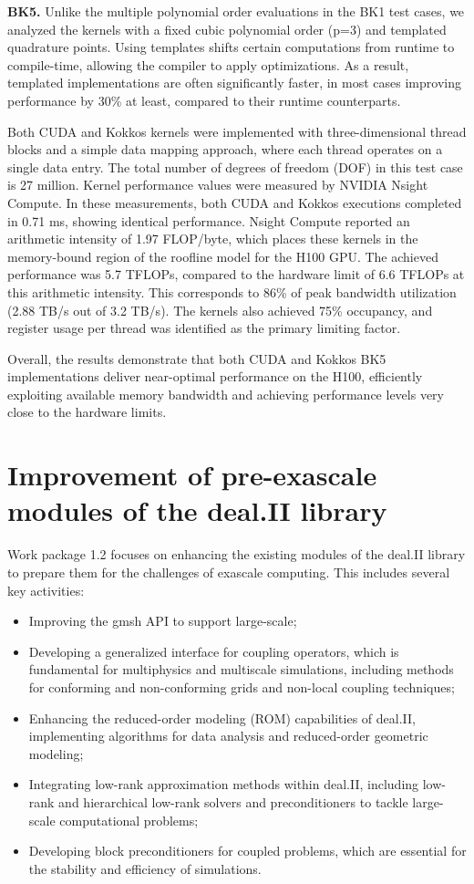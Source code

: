 \documentclass[a4paper,12pt]{article}
\begin{document}
{\bf BK5.} Unlike the multiple polynomial order evaluations in the BK1 test cases, we analyzed the kernels with a fixed cubic polynomial order (p=3) and templated quadrature points. Using templates shifts certain computations from runtime to compile-time, allowing the compiler to apply optimizations. As a result, templated implementations are often significantly faster, in most cases improving performance by 30\% at least, compared to their runtime counterparts.

Both CUDA and Kokkos kernels were implemented with three-dimensional thread blocks and a simple data mapping approach, where each thread operates on a single data entry. The total number of degrees of freedom (DOF) in this test case is 27 million. Kernel performance values were measured by NVIDIA Nsight Compute. In these measurements, both CUDA and Kokkos executions completed in 0.71 ms, showing identical performance. Nsight Compute reported an arithmetic intensity of 1.97 FLOP/byte, which places these kernels in the memory-bound region of the roofline model for the H100 GPU. The achieved performance was 5.7 TFLOPs, compared to the hardware limit of 6.6 TFLOPs at this arithmetic intensity. This corresponds to 86\% of peak bandwidth utilization (2.88 TB/s out of 3.2 TB/s). The kernels also achieved 75\% occupancy, and register usage per thread was identified as the primary limiting factor.

Overall, the results demonstrate that both CUDA and Kokkos BK5 implementations deliver near-optimal performance on the H100, efficiently exploiting available memory bandwidth and achieving performance levels very close to the hardware limits.


\section{Improvement of pre-exascale modules of the deal.II library}

Work package 1.2 focuses on enhancing the existing modules of the deal.II
library to prepare them for the challenges of exascale computing. This includes
several key activities: 
\begin{itemize}
    \item Improving the gmsh API to support large-scale;
    \item Developing a generalized interface for coupling operators, which
    is fundamental for multiphysics and multiscale simulations, including methods
    for conforming and non-conforming grids and non-local coupling techniques;
    \item Enhancing the reduced-order modeling (ROM) capabilities of deal.II,
    implementing algorithms for data analysis and reduced-order geometric modeling;
    \item Integrating low-rank approximation methods within deal.II, including
    low-rank and hierarchical low-rank solvers and preconditioners to tackle
    large-scale computational problems;
    \item Developing block preconditioners for coupled problems, which are
    essential for the stability and efficiency of simulations.
\end{itemize}
 
\end{document}
